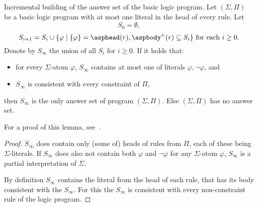 \begin{lemma}{Incremental building of the answer set of the basic logic program.}%
    \label{proof:incremental}
    Let $(\Sigma, \Pi)$ be a basic logic program with at most one literal
    in the head of every rule.
    Let
    \begin{equation*}
        S_0 = \emptyset,
    \end{equation*}
    \begin{equation*}
        S_{i+1} = S_{i}\cup \{\varphi \mid \{\varphi\} = \asphead(r), \aspbody^+(r) \subseteq S_i\} \text{ for each } i \geq 0.
    \end{equation*}
    Denote by $S_\infty$ the union of all $S_i$ for $i\geq 0$.
    If it holds that:
    \begin{itemize}
        \item for every $\Sigma$-atom $\varphi$, $S_\infty$ contains at most one
            of literals $\varphi, \neg\varphi$, and
        \item $S_\infty$ is consistent with every constraint of $\Pi$,
    \end{itemize}
    then $S_\infty$ is
    the only answer set of program $(\Sigma, \Pi)$. Else $(\Sigma, \Pi)$ has no answer set.

    For a proof of this lemma, see~.

    \begin{proof}
        $S_\infty$ does contain only (some of) heads of rules from $\Pi$,
        each of these being $\Sigma$-literals. If $S_\infty$ does also not contain
        both $\varphi$ and $\neg\varphi$ for any $\Sigma$-atom $\varphi$,
        $S_\infty$ is a partial interpretation of $\Sigma$.

        By definition $S_\infty$ contains the literal from the head of each rule,
        that has its body consistent with the $S_\infty$. For this the $S_\infty$
        is consistent with every non-constraint rule of the logic program.


\end{proof}
\end{lemma}

